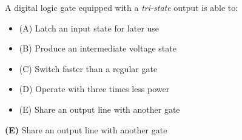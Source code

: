 


A digital logic gate equipped with a {\it tri-state} output is able to:

\begin{itemize}
\item{(A)} Latch an input state for later use
\vskip 5pt 
\item{(B)} Produce an intermediate voltage state
\vskip 5pt 
\item{(C)} Switch faster than a regular gate
\vskip 5pt 
\item{(D)} Operate with three times less power
\vskip 5pt 
\item{(E)} Share an output line with another gate
\end{itemize}







{\bf (E)} Share an output line with another gate
 










